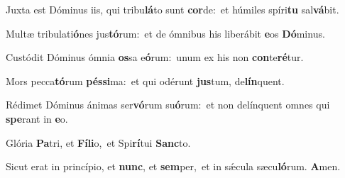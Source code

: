 \item Juxta est Dóminus iis, qui tribu\textbf{lá}to sunt \textbf{cor}de:~\psstar et húmiles spíri\textbf{tu} sal\textbf{vá}bit.
\item Multæ tribulati\textbf{ó}nes jus\textbf{tó}rum:~\psstar et de ómnibus his liberábit \textbf{e}os \textbf{Dó}minus.
\item Custódit Dóminus ómnia \textbf{os}sa e\textbf{ó}rum:~\psstar unum ex his non \textbf{con}te\textbf{ré}tur.
\item Mors pecca\textbf{tó}rum \textbf{péssi}ma:~\psstar et qui odérunt \textbf{jus}tum, de\textbf{lín}quent.
\item Rédimet Dóminus ánimas ser\textbf{vó}rum su\textbf{ó}rum:~\psstar et non delínquent omnes qui \textbf{spe}rant in \textbf{e}o.
\item Glória \textbf{Pa}tri, et \textbf{Fíli}o,~\psstar et Spi\textbf{rí}tui \textbf{Sanc}to.
\item Sicut erat in princípio, et \textbf{nunc}, et \textbf{sem}per,~\psstar et in sǽcula sæcu\textbf{ló}rum. \textbf{A}men.
